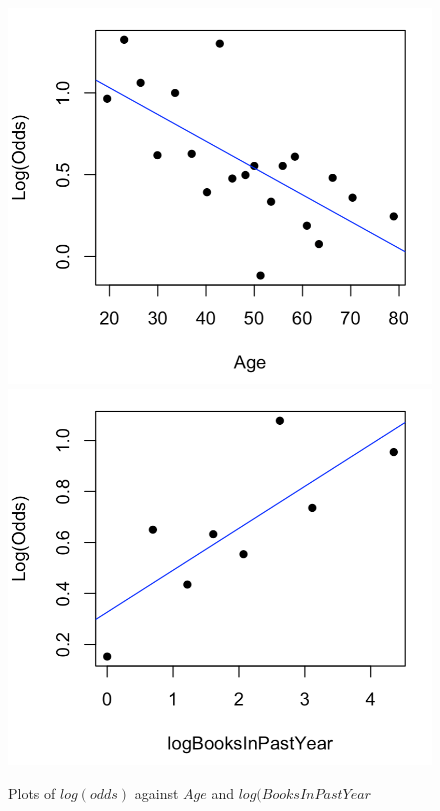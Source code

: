 \begin{figure}[h]
    \centering
    \includegraphics[scale=.5]{linplot_age.png}
    \includegraphics[scale=.5]{linplot_logbooks.png}
    \caption{Plots of $log(odds)$ against $Age$ and $log(BooksInPastYear$}
    \label{fig:conditions_linearity}
\end{figure}